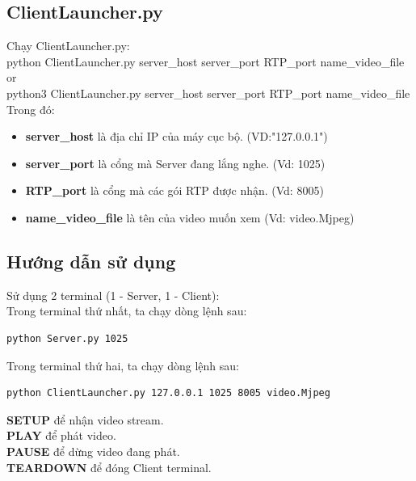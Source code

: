 \documentclass[a4paper]{article}
\begin{document}
\subsection{ClientLauncher.py}

Chạy ClientLauncher.py: \\
\indent python ClientLauncher.py server\_host server\_port RTP\_port name\_video\_file \\
\indent or \\
\indent python3 ClientLauncher.py server\_host server\_port RTP\_port name\_video\_file \\

\noindent Trong đó: 
\begin{itemize}
    \item \textbf{server\_host} \tab là địa chỉ IP của máy cục bộ. (VD:"127.0.0.1")
    \item \textbf{server\_port} là cổng mà Server đang lắng nghe. (Vd: 1025)
    \item \textbf{RTP\_port} là cổng mà các gói RTP được nhận. (Vd: 8005)
    \item \textbf{name\_video\_file} là tên của video muốn xem (Vd: video.Mjpeg)
\end{itemize}

\subsection{Hướng dẫn sử dụng}
\noindent Sử dụng 2 terminal (1 - Server, 1 - Client):\\

Trong terminal thứ nhất, ta chạy dòng lệnh sau:
\begin{lstlisting}[language=Python3]
python Server.py 1025 
\end{lstlisting}

Trong terminal thứ hai, ta chạy dòng lệnh sau:
\begin{lstlisting}
python ClientLauncher.py 127.0.0.1 1025 8005 video.Mjpeg
\end{lstlisting}
\textbf{SETUP} để nhận video stream.\\
\textbf{PLAY} để phát video.\\
\textbf{PAUSE} để dừng video đang phát.\\
\textbf{TEARDOWN} để đóng Client terminal.
\end{document}
